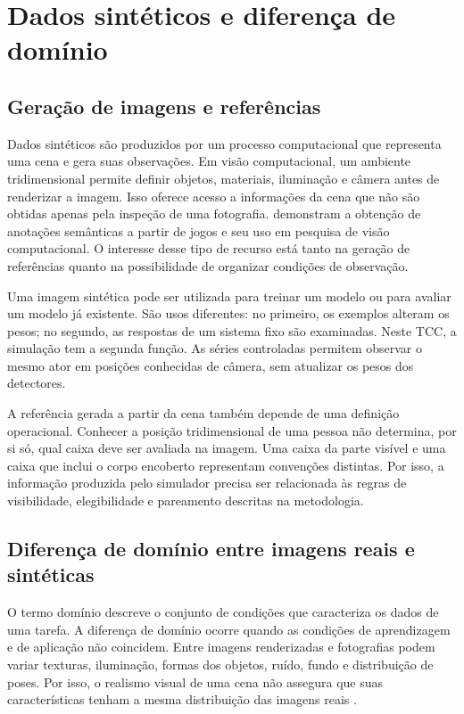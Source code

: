 \section{Dados sintéticos e diferença de domínio}
\label{sec:dados-sinteticos}
\subsection{Geração de imagens e referências}
Dados sintéticos são produzidos por um processo computacional que representa uma cena e gera suas observações. Em visão computacional, um ambiente tridimensional permite definir objetos, materiais, iluminação e câmera antes de renderizar a imagem. Isso oferece acesso a informações da cena que não são obtidas apenas pela inspeção de uma fotografia.  demonstram a obtenção de anotações semânticas a partir de jogos e seu uso em pesquisa de visão computacional. O interesse desse tipo de recurso está tanto na geração de referências quanto na possibilidade de organizar condições de observação.

Uma imagem sintética pode ser utilizada para treinar um modelo ou para avaliar um modelo já existente. São usos diferentes: no primeiro, os exemplos alteram os pesos; no segundo, as respostas de um sistema fixo são examinadas. Neste TCC, a simulação tem a segunda função. As séries controladas permitem observar o mesmo ator em posições conhecidas de câmera, sem atualizar os pesos dos detectores.

A referência gerada a partir da cena também depende de uma definição operacional. Conhecer a posição tridimensional de uma pessoa não determina, por si só, qual caixa deve ser avaliada na imagem. Uma caixa da parte visível e uma caixa que inclui o corpo encoberto representam convenções distintas. Por isso, a informação produzida pelo simulador precisa ser relacionada às regras de visibilidade, elegibilidade e pareamento descritas na metodologia.

\subsection{Diferença de domínio entre imagens reais e sintéticas}
O termo domínio descreve o conjunto de condições que caracteriza os dados de uma tarefa. A diferença de domínio ocorre quando as condições de aprendizagem e de aplicação não coincidem. Entre imagens renderizadas e fotografias podem variar texturas, iluminação, formas dos objetos, ruído, fundo e distribuição de poses. Por isso, o realismo visual de uma cena não assegura que suas características tenham a mesma distribuição das imagens reais \cite{tobin2017domain,tremblay2018synthetic}.

